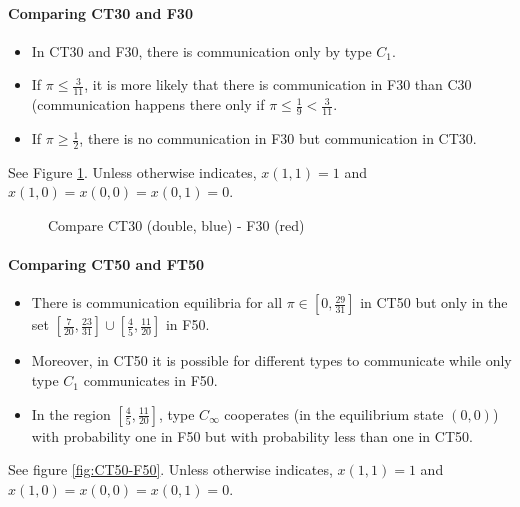 \documentclass[12pt]{article}
\theoremstyle{definition}
\theoremstyle{remark}
\begin{document}
\paragraph{Comparing CT30 and F30}
\begin{itemize}
    \item In CT30 and F30, there is communication only by type $C_1$.
    \item If $\pi\leq \frac{3}{11}$, it is more likely that there is communication in F30 than C30 (communication happens there only if $\pi\leq \frac{1}{9}<\frac{3}{11}$.
    \item If $\pi\geq \frac{1}{2}$, there is no communication in F30 but communication in CT30.
\end{itemize}
See Figure \ref{fig:CT30-F30}. Unless otherwise indicates, $x(1,1)=1$ and $x(1,0)=x(0,0)=x(0,1)=0$.

\begin{figure}[h]
\centering
       
    \caption{Compare CT30 (double, blue) - F30 (red)}
    \label{fig:CT30-F30}
\end{figure}

\paragraph{Comparing CT50 and FT50}
\begin{itemize}
    \item There is communication equilibria for all $\pi\in\left[0,\frac{29}{31}\right]$ in CT50 but only in the set $\left[\frac{7}{20},\frac{23}{31}\right]\cup \left[\frac{4}{5},\frac{11}{20}\right]$ in F50.
    \item Moreover, in CT50 it is possible for different types to communicate while only type $C_1$ communicates in F50.
    \item In the region $\left[\frac{4}{5},\frac{11}{20}\right]$, type $C_\infty$ cooperates (in the equilibrium state $(0,0)$) with probability one in F50 but with probability less than one in CT50.
\end{itemize}
%
See figure \ref{fig:CT50-F50}. Unless otherwise indicates, $x(1,1)=1$ and $x(1,0)=x(0,0)=x(0,1)=0$.
\end{document}
